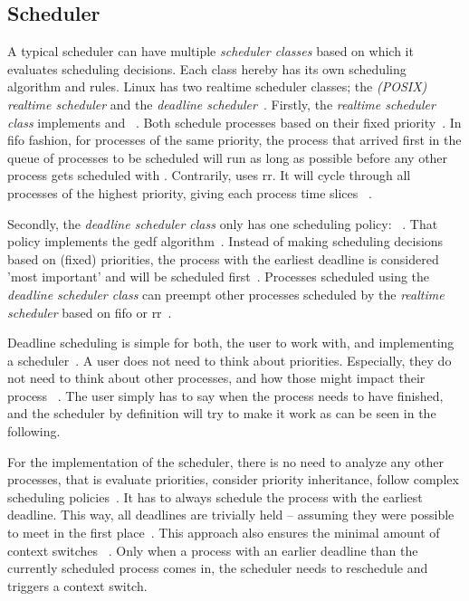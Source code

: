 \documentclass[10pt,twocolumn,a4paper]{article}
\begin{document}
\subsection{Scheduler}\label{subsec:scheduler}
A typical scheduler can have multiple \emph{scheduler classes} based on which it evaluates scheduling decisions.
Each class hereby has its own scheduling algorithm and rules.
Linux has two realtime scheduler classes; the \emph{(POSIX) realtime scheduler} and the \emph{deadline scheduler}~\cite{bristot_de_oliveira_deadline_2018}.
Firstly, the \emph{realtime scheduler class} implements  and ~\cite{lf:scheduler}.
Both schedule processes based on their fixed priority~\cite{lf:scheduler,de_oliveira_timing_2016}.
In \acrfull{fifo} fashion, for processes of the same priority, the process that arrived first in the queue of processes to be scheduled will run as long as possible before any other process gets scheduled with .
Contrarily,  uses \acrfull{rr}.
It will cycle through all processes of the highest priority, giving each process time slices ~\cite{bristot_de_oliveira_deadline_2018}.

Secondly, the \emph{deadline scheduler class} only has one scheduling policy: ~\cite{bristot_de_oliveira_deadline_2018}.
That policy implements the \acrfull{gedf} algorithm~\cite{lelli_deadline_2016}.
Instead of making scheduling decisions based on (fixed) priorities, the process with the earliest deadline is considered 'most important' and will be scheduled first~\cite{bristot_de_oliveira_deadline_2018}.
Processes scheduled using the \emph{deadline scheduler class} can preempt other processes scheduled by the \emph{realtime scheduler} based on \acrshort{fifo} or \acrshort{rr}~\cite{lf:scheduler}.

Deadline scheduling is simple for both, the user to work with, and implementing a scheduler~\cite{bristot_de_oliveira_deadline_2018}.
A user does not need to think about priorities.
Especially, they do not need to think about other processes, and how those might impact their process ~\cite{bristot_de_oliveira_deadline_2018}.
The user simply has to say when the process needs to have finished, and the scheduler by definition will try to make it work as can be seen in the following.

For the implementation of the scheduler, there is no need to analyze any other processes, that is evaluate priorities, consider priority inheritance, follow complex scheduling policies~\cite{bristot_de_oliveira_deadline_2018}.
It has to always schedule the process with the earliest deadline.
This way, all deadlines are trivially held -- assuming they were possible to meet in the first place~\cite{bristot_de_oliveira_deadline_2018}.
This approach also ensures the minimal amount of context switches ~\cite{bristot_de_oliveira_deadline_2018}.
Only when a process with an earlier deadline than the currently scheduled process comes in, the scheduler needs to reschedule and triggers a context switch.
\end{document}
